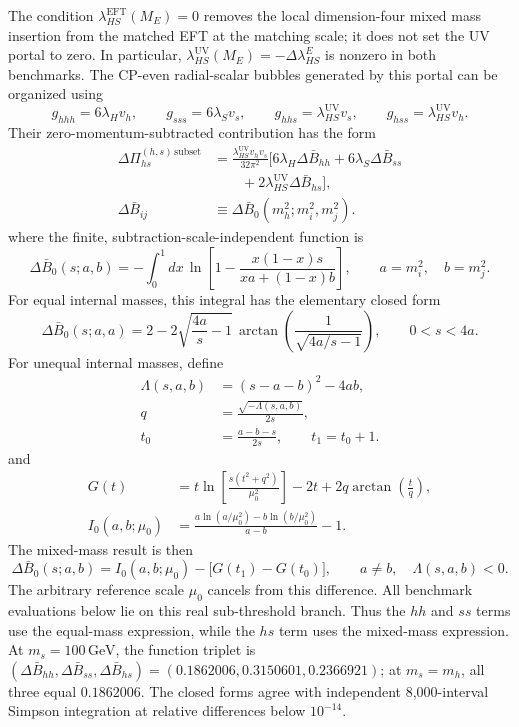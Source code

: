 \documentclass[12pt,a4paper]{article}
\begin{document}
The condition \(\lambda_{HS}^{\mathrm{EFT}}(M_E)=0\) removes the local dimension-four mixed mass insertion from the matched EFT at the matching scale; it does not set the UV portal to zero. In particular, \(\lambda_{HS}^{\mathrm{UV}}(M_E)=-\Delta\lambda_{HS}^{E}\) is nonzero in both benchmarks. The CP-even radial-scalar bubbles generated by this portal can be organized using
\[
g_{hhh}=6\lambda_Hv_h,\qquad
g_{sss}=6\lambda_Sv_s,\qquad
g_{hhs}=\lambda_{HS}^{\mathrm{UV}}v_s,\qquad
g_{hss}=\lambda_{HS}^{\mathrm{UV}}v_h.
\]
Their zero-momentum-subtracted contribution has the form
\[
\begin{aligned}
\Delta\Pi_{hs}^{(h,s)\,\mathrm{subset}}
&=\frac{\lambda_{HS}^{\mathrm{UV}}v_hv_s}{32\pi^2}
\Big[
6\lambda_H\Delta\bar B_{hh}
+6\lambda_S\Delta\bar B_{ss}\\
&\qquad
+2\lambda_{HS}^{\mathrm{UV}}\Delta\bar B_{hs}
\Big],\\
\Delta\bar B_{ij}
&\equiv\Delta\bar B_0(m_h^2;m_i^2,m_j^2).
\end{aligned}
\]
where the finite, subtraction-scale-independent function is
\[
\Delta\bar B_0(s;a,b)
=-\int_0^1 dx\,
\ln\!\left[
1-\frac{x(1-x)s}{xa+(1-x)b}
\right],
\qquad a=m_i^2,\quad b=m_j^2.
\]
For equal internal masses, this integral has the elementary closed form
\[
\boxed{
\Delta\bar B_0(s;a,a)
=2-2\sqrt{\frac{4a}{s}-1}\,
\arctan\!\left(\frac{1}{\sqrt{4a/s-1}}\right),
\qquad 0<s<4a.
}
\]
For unequal internal masses, define
\[
\begin{aligned}
\Lambda(s,a,b)&=(s-a-b)^2-4ab,\\
q&=\frac{\sqrt{-\Lambda(s,a,b)}}{2s},\\
t_0&=\frac{a-b-s}{2s},\qquad t_1=t_0+1.
\end{aligned}
\]
and
\[
\begin{aligned}
G(t)&=t\ln\!\left[\frac{s(t^2+q^2)}{\mu_0^2}\right]
-2t+2q\arctan\!\left(\frac{t}{q}\right),\\
I_0(a,b;\mu_0)&=
\frac{a\ln(a/\mu_0^2)-b\ln(b/\mu_0^2)}{a-b}-1.
\end{aligned}
\]
The mixed-mass result is then
\[
\boxed{
\Delta\bar B_0(s;a,b)
=I_0(a,b;\mu_0)-\big[G(t_1)-G(t_0)\big],
\qquad a\ne b,\quad \Lambda(s,a,b)<0.
}
\]
The arbitrary reference scale \(\mu_0\) cancels from this difference. All benchmark evaluations below lie on this real sub-threshold branch. Thus the \(hh\) and \(ss\) terms use the equal-mass expression, while the \(hs\) term uses the mixed-mass expression. At \(m_s=100\,\mathrm{GeV}\), the function triplet is \((\Delta\bar B_{hh},\Delta\bar B_{ss},\Delta\bar B_{hs})=(0.1862006,0.3150601,0.2366921)\); at \(m_s=m_h\), all three equal \(0.1862006\). The closed forms agree with independent 8,000-interval Simpson integration at relative differences below \(10^{-14}\).
\end{document}
